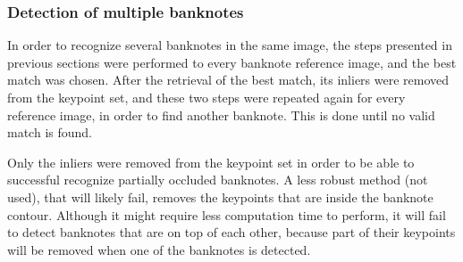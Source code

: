 \subsubsection{Detection of multiple banknotes}

In order to recognize several banknotes in the same image, the steps presented in previous sections were performed to every banknote reference image, and the best match was chosen. After the retrieval of the best match, its inliers were removed from the keypoint set, and these two steps were repeated again for every reference image, in order to find another banknote. This is done until no valid match is found.

Only the inliers were removed from the keypoint set in order to be able to successful recognize partially occluded banknotes. A less robust method (not used), that will likely fail, removes the keypoints that are inside the banknote contour. Although it might require less computation time to perform, it will fail to detect banknotes that are on top of each other, because part of their keypoints will be removed when one of the banknotes is detected.
